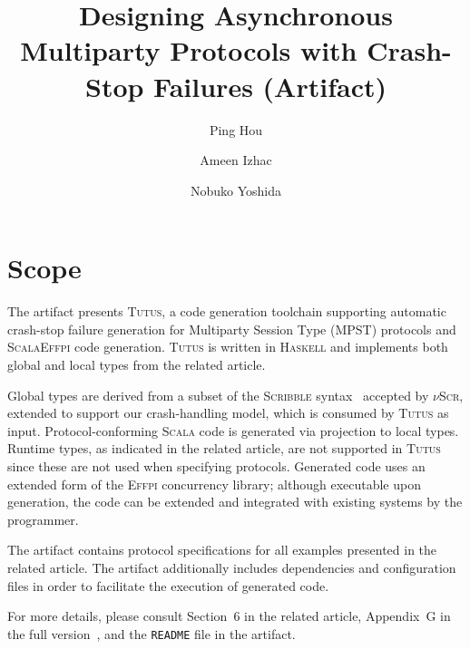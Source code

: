 \documentclass[a4paper,UKenglish]{darts-v2021}
\title{Designing Asynchronous Multiparty Protocols with Crash-Stop Failures
(Artifact)}
\author{Ping Hou}{University of Oxford, UK}{%
ping.hou@cs.ox.ac.uk
}{%
https://orcid.org/0000-0001-6899-9971
}{}
\author{Ameen Izhac}{%
University of Oxford, UK
}{%
scro5167@ox.ac.uk
}{%
https://orcid.org/0000-0003-1236-7160
}{}
\author{Nobuko Yoshida}{University of Oxford, UK}{%
nobuko.yoshida@cs.ox.ac.uk
}{%
https://orcid.org/0000-0002-3925-8557
}{}
\newenvironment{scope}{\section{Scope}}{}
\newcommand{\Scribble}[0]{\textsc{Scribble}\xspace}
\newcommand{\Effpi}[0]{\textsc{Effpi}\xspace}
\newcommand{\newTool}[0]{\textsc{Tutus}\xspace}
\newcommand{\Scala}[0]{\textsc{Scala}\xspace}
\newcommand{\Haskell}[0]{\textsc{Haskell}\xspace}
\newcommand{\nuScr}[0]{\texorpdfstring{$\nu$\textsc{Scr}}{nuScr}\xspace}
\begin{document}
\maketitle

\begin{abstract}
  
\end{abstract}


\begin{scope}
The artifact presents \newTool, a code generation toolchain supporting automatic crash-stop failure
generation for Multiparty Session Type (MPST) protocols and \Scala \Effpi code generation.
%
\newTool is written in \Haskell and implements both global and local types
from the related article.

Global types are derived from a subset of the \Scribble syntax~\cite{YHNN2013}
accepted by \nuScr, extended to support our crash-handling model, which is
consumed by \newTool as input. Protocol-conforming \Scala code is generated via
projection to local types. Runtime types, as indicated in the related article,
are not supported in \newTool since these are not used when specifying
protocols. Generated code uses an extended form of the \Effpi concurrency
library; although executable upon generation, the code can be extended and
integrated with existing systems by the programmer.

The artifact contains protocol specifications for all examples presented in the
related article. The artifact additionally includes dependencies and
configuration files in order to facilitate the execution of generated code.
%

For more details, please consult Section~6 in the related article, Appendix~G in
the full version~\cite{FullVer}, and the \texttt{README} file in the artifact.


\end{scope}
\end{document}
